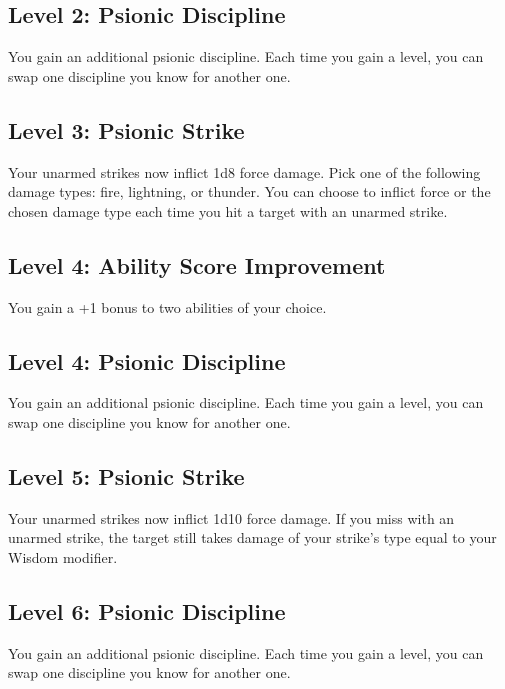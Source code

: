 \documentclass[12pt,letterpaper,twocolumn,openany,nodeprecatedcode,bg=none]{dndbook}
\begin{document}
\subsection{Level 2: Psionic
Discipline}\label{level-2-psionic-discipline}

You gain an additional psionic discipline. Each time you gain a level,
you can swap one discipline you know for another one.

\subsection{Level 3: Psionic Strike}\label{level-3-psionic-strike}

Your unarmed strikes now inflict 1d8 force damage. Pick one of the
following damage types: fire, lightning, or thunder. You can choose to
inflict force or the chosen damage type each time you hit a target with
an unarmed strike.

\subsection{Level 4: Ability Score
Improvement}\label{level-4-ability-score-improvement}

You gain a +1 bonus to two abilities of your choice.

\subsection{Level 4: Psionic
Discipline}\label{level-4-psionic-discipline}

You gain an additional psionic discipline. Each time you gain a level,
you can swap one discipline you know for another one.

\subsection{Level 5: Psionic Strike}\label{level-5-psionic-strike}

Your unarmed strikes now inflict 1d10 force damage. If you miss with an
unarmed strike, the target still takes damage of your strike's type
equal to your Wisdom modifier.

\subsection{Level 6: Psionic
Discipline}\label{level-6-psionic-discipline}

You gain an additional psionic discipline. Each time you gain a level,
you can swap one discipline you know for another one.
\end{document}
